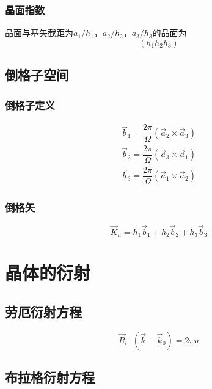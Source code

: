 \documentclass{article}
\begin{document}
\begin{multicols}{2}
\subsubsection{晶面指数}
晶面与基矢截距为$a_1/h_1$，$a_2/h_2$，$a_3/h_3$的晶面为
\begin{equation*}
  \left( h_1h_2h_3 \right)
\end{equation*}

\subsection{倒格子空间}

\subsubsection{倒格子定义}

\begin{equation*}
  \begin{aligned}
    \vec{b}_1 = \dfrac{2\pi}{\Omega} \left( \vec{a}_2 \times \vec{a}_3 \right) \\
    \vec{b}_2 = \dfrac{2\pi}{\Omega} \left( \vec{a}_3 \times \vec{a}_1 \right) \\
    \vec{b}_3 = \dfrac{2\pi}{\Omega} \left( \vec{a}_1 \times \vec{a}_2 \right)
  \end{aligned}
\end{equation*}

\subsubsection{倒格矢}

\begin{equation*}
  \vec{K}_h = h_1 \vec{b}_1 + h_2 \vec{b}_2 + h_3 \vec{b}_3
\end{equation*}

\section{晶体的衍射}

\subsection{劳厄衍射方程}

\begin{equation*}
  \vec{R}_l \cdot \left( \vec{k} - \vec{k}_0 \right) = 2\pi n
\end{equation*}

\subsection{布拉格衍射方程}


\end{multicols}
\end{document}
